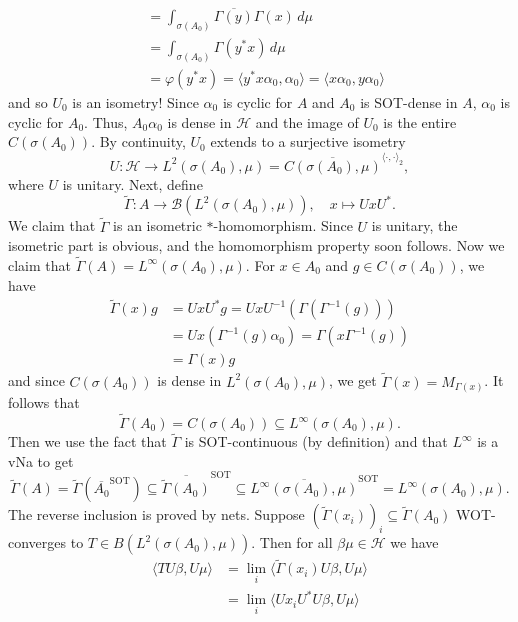 \begin{myproof}
\begin{align*}
    &= \int_{\sigma (A_0)}  \overline{\Gamma(y)} \Gamma(x)\, d\mu \\
    &= \int_{\sigma (A_0)} \Gamma(y^* x)\, d\mu \\
    &= \varphi(y^* x) = \langle y^* x \alpha_0, \alpha_0 \rangle = \langle x \alpha_0, y \alpha_0\rangle
  \end{align*}
  and so $U_0$ is an isometry! Since $\alpha_0$ is cyclic for $A$ and $A_0$ is SOT-dense in $A$, $\alpha_0$ is cyclic for $A_0$. Thus, $A_0 \alpha_0$ is dense in $\mathcal{H}$ and the image of $U_0$ is the entire $C(\sigma(A_0))$. By continuity, $U_0$ extends to a surjective isometry 
  $$ U : \mathcal{H} \to L^2 (\sigma(A_0), \mu) = \overline{C(\sigma(A_0), \mu)}^{\langle \cdot, \cdot \rangle_2}, $$
  where $U$ is unitary. Next, define 
  $$ \widetilde{\Gamma} : A \to \mathcal{B} (L^2 (\sigma(A_0), \mu)), \quad x \mapsto UxU^*. $$
  We claim that $\widetilde{\Gamma}$ is an isometric $*$-homomorphism. Since $U$ is unitary, the isometric part is obvious, and the homomorphism property soon follows.
  Now we claim that $\widetilde{\Gamma} (A) = L^\infty (\sigma(A_0), \mu)$. For $x \in A_0$ and $g \in C(\sigma(A_0))$, we have 
  \begin{align*}
    \widetilde{\Gamma} (x) g &= UxU^* g = U x U^{-1} (\Gamma (\Gamma^{-1} (g))) \\
    &= U x (\Gamma^{-1} (g)\alpha_0)= \Gamma (x \Gamma^{-1} (g)) \\ 
    &= \Gamma(x) g 
  \end{align*}
  and since $C(\sigma (A_0))$ is dense in $L^2 (\sigma(A_0), \mu)$, we get $\widetilde{\Gamma}(x) = M_{\Gamma(x)}$. It follows that 
  $$ \widetilde{\Gamma} (A_0) = C(\sigma (A_0)) \subseteq L^\infty (\sigma(A_0), \mu). $$
  Then we use the fact that $\widetilde{\Gamma}$ is SOT-continuous (by definition) and that $L^\infty$ is a vNa to get
  $$ \widetilde{\Gamma} (A) = \widetilde{\Gamma} (\overline{A_0}^{\mathrm{SOT}}) \subseteq \overline{\widetilde{\Gamma} (A_0)}^{\mathrm{SOT}} \subseteq \overline{L^\infty (\sigma(A_0), \mu)}^{\mathrm{SOT}} = L^\infty (\sigma(A_0), \mu). $$
  The reverse inclusion is proved by nets. Suppose $(\widetilde{\Gamma} (x_i))_i \subseteq \widetilde{\Gamma} (A_0)$ WOT-converges to $T \in B(L^2 (\sigma(A_0), \mu))$. Then for all $\beta \mu \in \mathcal{H}$ we have 
  \begin{align*}
    \langle TU \beta, U\mu\rangle &= \lim_{i} \langle \widetilde{\Gamma} (x_i) U\beta, U\mu\rangle \\
    &= \lim_i \langle Ux_i U^* U \beta, U\mu \rangle \\

\end{align*}
\end{myproof}
